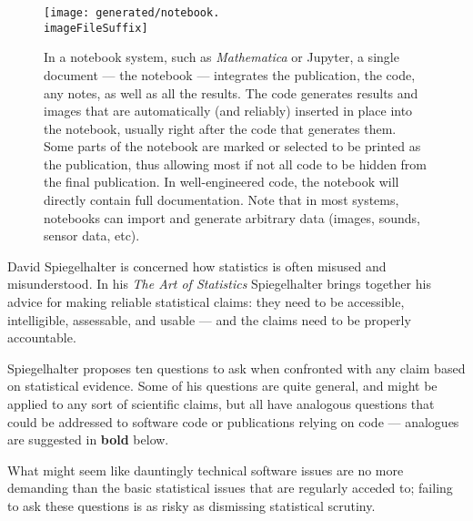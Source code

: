 \documentclass[10pt,a4paper]{article}
\begin{document}
\begin{figure}[t]
   \centering
   \texttt{[image: generated/notebook.\\imageFileSuffix]} 
   \caption{In a notebook system, such as \emph{Mathematica\/} or Jupyter, a single document --- the notebook --- integrates the publication, the code, any notes, as well as all the results. The code generates results and images that are automatically (and reliably) inserted in place into the notebook, usually right after the code that generates them. Some parts of the notebook are marked or selected to be printed as the publication, thus allowing most if not all code to be hidden from the final publication. In well-engineered code, the notebook will directly contain full documentation.
Note that in most systems, notebooks can import and generate arbitrary data (images, sounds, sensor data, etc).}
   \label{fig:notebook}
\end{figure}


David Spiegelhalter is concerned how statistics is often misused and misunderstood. In his \emph{The Art of Statistics\/} \cite{Spiegelhalter} Spiegelhalter brings together his advice for making reliable statistical claims: they need to be accessible, intelligible, assessable, and usable --- and the claims need to be properly accountable. 

Spiegelhalter proposes ten questions to ask when confronted with any claim based on statistical evidence. Some of his questions are quite general, and might be applied to any sort of scientific claims, but all have analogous questions that could be addressed to software code or publications relying on code --- analogues are suggested in \textbf{bold} below. 

What might seem like dauntingly technical software issues are no more demanding than the basic statistical issues that are regularly acceded to; failing to ask these questions is as risky as dismissing statistical scrutiny.

\def\questionsection#1{\changemysubsection{#1}}
\def\question#1{\item \emph{#1\/}}
\def\sequestion#1{\begin{itemize}\raggedright\item[$\blacktriangleright$] \textbf{#1}\end{itemize}}

\questionsection{How trustworthy are the numbers?}
\end{document}
